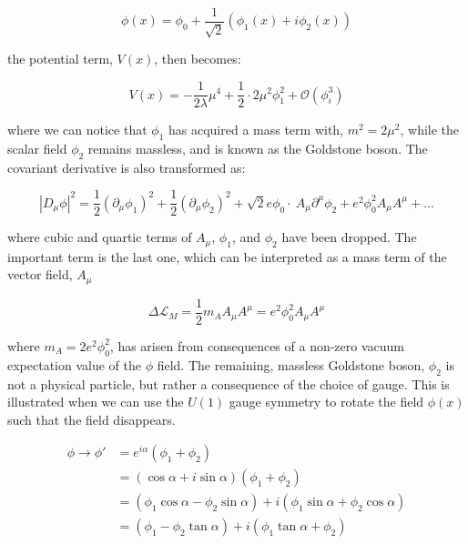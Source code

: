 \begin{equation}\label{eq:abelian_higgs_mechanism_expanded_phi}
\phi(x) = \phi_{0} + \frac{1}{\sqrt{2}}(\phi_{1}(x) + i\phi_{2}(x))
\end{equation}

\noindent the potential term, $V(x)$, then becomes:

\begin{equation}\label{eq:abelian_higgs_mechanism_expanded_pot}
V(x) = -\frac{1}{2\lambda}\mu^{4} +
\frac{1}{2}\cdot2\mu^{2}\phi_{1}^{2} + \mathcal{O}(\phi_{i}^{3})
\end{equation}

\noindent where we can notice that $\phi_{1}$ has acquired a mass term
with, $m^{2} = 2\mu^{2}$, while the scalar field $\phi_{2}$ remains
massless, and is known as the Goldstone boson.  The covariant
derivative is also transformed as:

\begin{equation}\label{eq:abelian_higgs_mechanism_expanded_covDer}
|D_{\mu}\phi|^{2} = \frac{1}{2}(\partial_{\mu}\phi_{1})^{2} +
\frac{1}{2}(\partial_{\mu}\phi_{2})^{2} +
\sqrt{2}e\phi_{0}\cdot~A_{\mu}\partial^{\mu}\phi_{2} +
e^{2}\phi_{0}^{2}A_{\mu}A^{\mu} + ...
\end{equation}

\noindent where cubic and quartic terms of $A_{\mu}$, $\phi_{1}$,
and $\phi_{2}$ have been dropped.  The important term is the last one,
which can be interpreted as a mass term of the vector field, $A_{\mu}$

\begin{equation}\label{eq:abelian_higgs_mechanism_mass_term_Amu}
\Delta\mathcal{L}_{M} =
  \frac{1}{2}m_{A}A_{\mu}A^{\mu} = e^{2}\phi_{0}^{2}A_{\mu}A^{\mu}
\end{equation}

\noindent where $m_{A} = 2e^{2}\phi_{0}^{2}$, has arisen from
consequences of a non-zero vacuum expectation value of the $\phi$
field.  The remaining, massless Goldstone boson, $\phi_{2}$ is not a
physical particle, but rather a consequence of the choice of gauge.
This is illustrated when we can use the $U(1)$ gauge symmetry to rotate
the field $\phi(x)$ such that the field disappears.  

\begin{equation}\label{eq:abelian_higgs_mechanism_rotate_phi2}
\begin{aligned}
 \phi \rightarrow \phi' & = e^{i\alpha}(\phi_{1} + \phi_{2}) \\
& = (\cos{\alpha} + i\sin{\alpha})(\phi_{1} + \phi_{2}) \\
& = (\phi_{1}\cos{\alpha} - \phi_{2}\sin{\alpha}) +
i(\phi_{1}\sin{\alpha} + \phi_{2}\cos{\alpha}) \\
& = (\phi_{1} - \phi_{2}\tan{\alpha}) + i(\phi_{1}\tan{\alpha} +
\phi_{2})
\end{aligned}
\end{equation}

